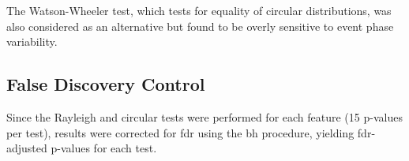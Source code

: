 The Watson-Wheeler test, which tests for equality of circular distributions, was also considered as an alternative but found to be overly sensitive to event phase variability.

\subsection{False Discovery Control} \label{subsec:fdr}
Since the Rayleigh and circular tests were performed for each feature (15 p-values per test), results were corrected for \gls{fdr} using the \gls{bh} procedure, yielding \gls{fdr}-adjusted p-values for each test.

